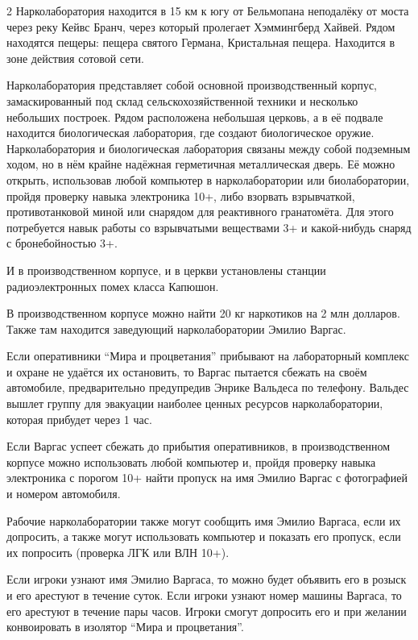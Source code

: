 \documentclass[twoside]{article}
\begin{document}
\begin{multicols}{2}
Нарколаборатория находится в 15 км к югу от Бельмопана неподалёку от
моста через реку Кейвс Бранч, через который пролегает Хэммингберд
Хайвей. Рядом находятся пещеры: пещера святого Германа, Кристальная
пещера. Находится в зоне действия сотовой сети.

Нарколаборатория представляет собой основной производственный корпус,
замаскированный под склад сельскохозяйственной техники и несколько
небольших построек. Рядом расположена небольшая церковь, а в её подвале
находится биологическая лаборатория, где создают биологическое оружие.
Нарколаборатория и биологическая лаборатория связаны между собой
подземным ходом, но в нём крайне надёжная герметичная металлическая дверь. Её можно открыть,
использовав любой компьютер в нарколаборатории или биолаборатории, пройдя проверку навыка
электроника 10+, либо взорвать взрывчаткой, противотанковой миной или снарядом для реактивного
гранатомёта. Для этого потребуется навык работы со взрывчатыми веществами 3+ и какой-нибудь
снаряд с бронебойностью 3+.

И в производственном корпусе, и в церкви установлены станции радиоэлектронных помех класса Капюшон.

В производственном корпусе можно найти 20 кг наркотиков на 2 млн
долларов. Также там находится заведующий нарколаборатории Эмилио Варгас.

Если оперативники \enquote{Мира и процветания} прибывают на лабораторный
комплекс и охране не удаётся их остановить, то Варгас пытается сбежать на своём автомобиле, предварительно
предупредив Энрике Вальдеса по телефону. Вальдес вышлет группу для
эвакуации наиболее ценных ресурсов нарколаборатории, которая прибудет через 1 час.

Если Варгас успеет сбежать до прибытия оперативников, в производственном
корпусе можно использовать любой компьютер и, пройдя проверку навыка электроника с порогом 10+
найти пропуск на имя Эмилио Варгас с фотографией и номером автомобиля.

Рабочие нарколаборатории также могут сообщить имя Эмилио Варгаса,
если их допросить, а также могут использовать компьютер и показать его пропуск, если их
попросить (проверка ЛГК или ВЛН 10+).

Если игроки узнают имя Эмилио Варгаса, то можно будет объявить его в розыск и его арестуют в течение суток.
Если игроки узнают номер машины Варгаса, то его арестуют в течение пары часов.
Игроки смогут допросить его и при желании конвоировать в изолятор \enquote{Мира и процветания}.


\end{multicols}
\end{document}
